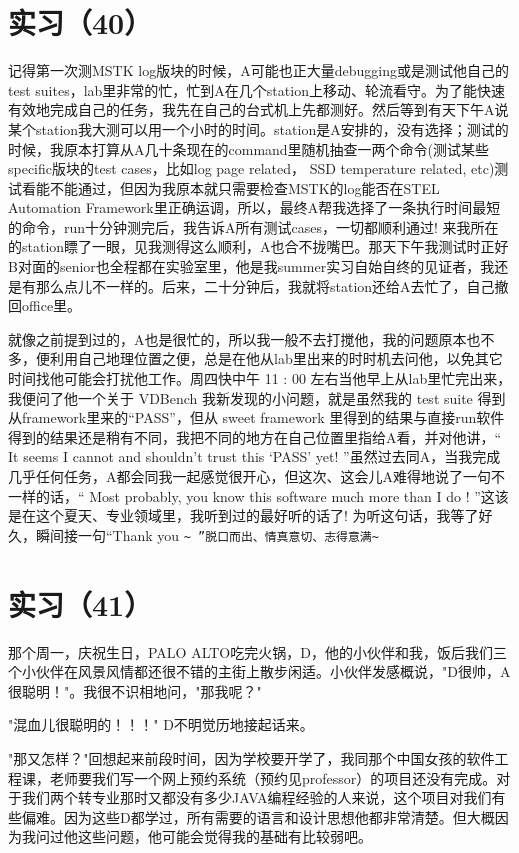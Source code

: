 \documentclass[12pt]{book}
\begin{document}
\section{实习（40）}
\label{sec-5-43}

记得第一次测MSTK log版块的时候，A可能也正大量debugging或是测试他自己的test suites，lab里非常的忙，忙到A在几个station上移动、轮流看守。为了能快速有效地完成自己的任务，我先在自己的台式机上先都测好。然后等到有天下午A说某个station我大测可以用一个小时的时间。station是A安排的，没有选择；测试的时候，我原本打算从A几十条现在的command里随机抽查一两个命令(测试某些specific版块的test cases，比如log page related， SSD temperature related, etc)测试看能不能通过，但因为我原本就只需要检查MSTK的log能否在STEL Automation Framework里正确运调，所以，最终A帮我选择了一条执行时间最短的命令，run十分钟测完后，我告诉A所有测试cases，一切都顺利通过! 来我所在的station瞟了一眼，见我测得这么顺利，A也合不拢嘴巴。那天下午我测试时正好B对面的senior也全程都在实验室里，他是我summer实习自始自终的见证者，我还是有那么点儿不一样的。后来，二十分钟后，我就将station还给A去忙了，自己撤回office里。

就像之前提到过的，A也是很忙的，所以我一般不去打搅他，我的问题原本也不多，便利用自己地理位置之便，总是在他从lab里出来的时时机去问他，以免其它时间找他可能会打扰他工作。周四快中午 11 : 00 左右当他早上从lab里忙完出来，我便问了他一个关于 VDBench 我新发现的小问题，就是虽然我的 test suite 得到从framework里来的“PASS”，但从 sweet framework 里得到的结果与直接run软件得到的结果还是稍有不同，我把不同的地方在自己位置里指给A看，并对他讲，“ It seems I cannot and shouldn’t trust this ‘PASS’ yet! ”虽然过去同A，当我完成几乎任何任务，A都会同我一起感觉很开心，但这次、这会儿A难得地说了一句不一样的话，“ Most probably, you know this software much more than I do ! ”这该是在这个夏天、专业领域里，我听到过的最好听的话了! 为听这句话，我等了好久，瞬间接一句“Thank you \verb,~ ”脱口而出、情真意切、志得意满~,


\section{实习（41）}
\label{sec-5-44}

那个周一，庆祝生日，PALO ALTO吃完火锅，D，他的小伙伴和我，饭后我们三个小伙伴在风景风情都还很不错的主街上散步闲适。小伙伴发感概说，"D很帅，A很聪明！"。我很不识相地问，"那我呢？" 

"混血儿很聪明的！！！" D不明觉历地接起话来。

"那又怎样？"回想起来前段时间，因为学校要开学了，我同那个中国女孩的软件工程课，老师要我们写一个网上预约系统（预约见professor）的项目还没有完成。对于我们两个转专业那时又都没有多少JAVA编程经验的人来说，这个项目对我们有些偏难。因为这些D都学过，所有需要的语言和设计思想他都非常清楚。但大概因为我问过他这些问题，他可能会觉得我的基础有比较弱吧。
\end{document}
